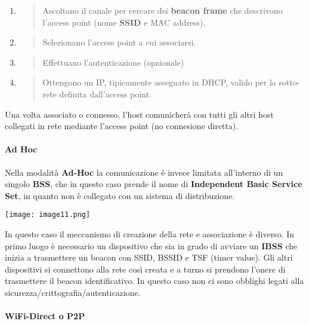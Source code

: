 \begin{enumerate}
\def\labelenumi{\arabic{enumi}.}
\item
  \begin{quote}
  Ascoltano il canale per cercare dei \textbf{beacon frame} che
  descrivono l'access point (nome \textbf{SSID} e MAC address).
  \end{quote}
\item
  \begin{quote}
  Selezionano l'access point a cui associarsi.
  \end{quote}
\item
  \begin{quote}
  Effettuano l'autenticazione (opzionale)
  \end{quote}
\item
  \begin{quote}
  Ottengono un IP, tipicamente assegnato in DHCP, valido per la
  sotto-rete definita dall'access point.
  \end{quote}
\end{enumerate}

Una volta associato o connesso, l'host comunicherà con tutti gli altri
host collegati in rete mediante l'access point (no connesione diretta).

\paragraph{Ad Hoc}\label{ad-hoc}

Nella modalità \textbf{Ad-Hoc} la comunicazione è invece limitata
all'interno di un singolo \textbf{BSS}, che in questo caso prende il
nome di \textbf{Independent Basic Service Set}, in quanto non è
collegato con un sistema di distribuzione.

\texttt{[image: image11.png]}

In questo caso il meccanismo di creazione della rete e associazione è
diverso. In primo luogo è necessario un dispositivo che sia in grado di
avviare un \textbf{IBSS} che inizia a trasmettere un beacon con SSID,
BSSID e TSF (timer value). Gli altri dispositivi si connettono alla rete
così creata e a turno si prendono l'onere di trasmettere il beacon
identificativo. In questo caso non ci sono obblighi legati alla
sicurezza/crittografia/autenticazione.

\paragraph{WiFi-Direct o P2P}\label{wifi-direct-o-p2p}

